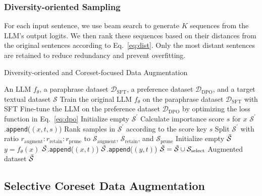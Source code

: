 \subsubsection{Diversity-oriented Sampling}


For each input sentence, we use beam search to generate \(K\) sequences from the LLM's output logits. 
We then rank these sequences based on their distances from the original sentences according to Eq.~\ref{eq:dist}. 
Only the most distant sentences are retained to reduce redundancy and prevent overfitting.

\begin{algorithm}[H]
\small
    \caption{Diversity-oriented and Coreset-focused Data Augmentation}
    \label{algo}
    \begin{algorithmic}[1]
    \REQUIRE An LLM \(f_{\theta}\), a paraphrase dataset \(\mathcal{D}_{\text{SFT}}\), a preference dataset \(\mathcal{D}_{\text{DPO}}\), and a target textual dataset \(\mathcal{S}\)
    \STATE Train the original LLM \(f_{\theta}\) on the paraphrase dataset \(\mathcal{D}_{\text{SFT}}\) with SFT
    \STATE Fine-tune the LLM on the preference dataset \(\mathcal{D}_{\text{DPO}}\) by optimizing the loss function in Eq.~\ref{eq:dpo}
    \STATE Initialize empty \(\mathcal{S}^\prime\)
        \STATE Calculate importance score \(s\) for \(x\)
        \STATE \(\mathcal{S}^\prime\).\texttt{append}(\((x,t,s)\))
    \ENDFOR
    \STATE Rank samples in \(\mathcal{S}^\prime\) according to the score key \(s\)
    \STATE Split \(\mathcal{S}^\prime\) with ratio \(r_\text{augment} : r_\text{retain} : r_\text{prune}\) to \(\mathcal{S}_{\text{augment}}\), \(\mathcal{S}_{\text{retain}}\), and \(\mathcal{S}_{\text{prune}}\)
    \STATE Initialize empty \(\mathcal{\Tilde{S}}\)
        \STATE \(y = f_{\theta} (x)\)
        \STATE \(\mathcal{\Tilde{S}}\).\texttt{append}(\((x,t)\))
        \STATE \(\mathcal{\Tilde{S}}\).\texttt{append}(\((y,t)\))
    \ENDFOR
    \STATE \(\mathcal{\Tilde{S}} = \mathcal{\Tilde{S}} \cup \mathcal{S}_{\text{select}}\)
    \RETURN Augmented dataset \(\mathcal{\Tilde{S}}\)
    \end{algorithmic}
\end{algorithm}
\vspace{-6mm}

\subsection{Selective Coreset Data Augmentation}


